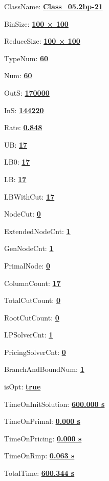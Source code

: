 \documentclass[11pt]{article}
\begin{document}
\pagestyle{empty}


ClassName: \underline{\textbf{Class_05.2bp-21}}
\par
BinSize: \underline{\textbf{100 × 100}}
\par
ReduceSize: \underline{\textbf{100 × 100}}
\par
TypeNum: \underline{\textbf{60}}
\par
Num: \underline{\textbf{60}}
\par
OutS: \underline{\textbf{170000}}
\par
InS: \underline{\textbf{144220}}
\par
Rate: \underline{\textbf{0.848}}
\par
UB: \underline{\textbf{17}}
\par
LB0: \underline{\textbf{17}}
\par
LB: \underline{\textbf{17}}
\par
LBWithCut: \underline{\textbf{17}}
\par
NodeCut: \underline{\textbf{0}}
\par
ExtendedNodeCnt: \underline{\textbf{1}}
\par
GenNodeCnt: \underline{\textbf{1}}
\par
PrimalNode: \underline{\textbf{0}}
\par
ColumnCount: \underline{\textbf{17}}
\par
TotalCutCount: \underline{\textbf{0}}
\par
RootCutCount: \underline{\textbf{0}}
\par
LPSolverCnt: \underline{\textbf{1}}
\par
PricingSolverCnt: \underline{\textbf{0}}
\par
BranchAndBoundNum: \underline{\textbf{1}}
\par
isOpt: \underline{\textbf{true}}
\par
TimeOnInitSolution: \underline{\textbf{600.000 s}}
\par
TimeOnPrimal: \underline{\textbf{0.000 s}}
\par
TimeOnPricing: \underline{\textbf{0.000 s}}
\par
TimeOnRmp: \underline{\textbf{0.063 s}}
\par
TotalTime: \underline{\textbf{600.344 s}}
\par
\newpage


\end{document}
